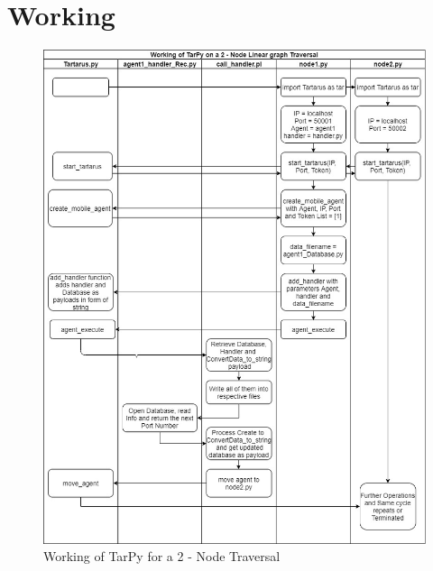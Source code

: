 \section{Working}
\begin{figure}[!ht]
    \centerline{\includegraphics[width=\linewidth]{images/Working.jpg}}
    \caption{Working of TarPy for a 2 - Node Traversal}
    \label{working}
\end{figure}


